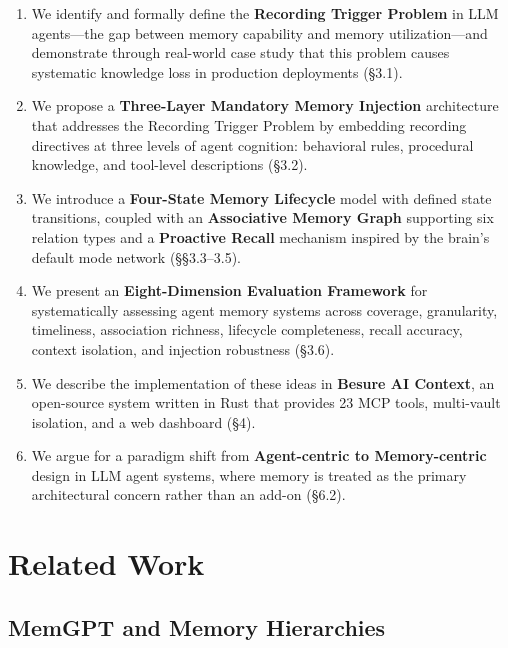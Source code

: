 \documentclass[11pt]{article}
\begin{document}
\begin{enumerate}
    \item We identify and formally define the \textbf{Recording Trigger Problem} in LLM agents---the gap between memory capability and memory utilization---and demonstrate through real-world case study that this problem causes systematic knowledge loss in production deployments (\S3.1).

    \item We propose a \textbf{Three-Layer Mandatory Memory Injection} architecture that addresses the Recording Trigger Problem by embedding recording directives at three levels of agent cognition: behavioral rules, procedural knowledge, and tool-level descriptions (\S3.2).

    \item We introduce a \textbf{Four-State Memory Lifecycle} model with defined state transitions, coupled with an \textbf{Associative Memory Graph} supporting six relation types and a \textbf{Proactive Recall} mechanism inspired by the brain's default mode network (\S\S3.3--3.5).

    \item We present an \textbf{Eight-Dimension Evaluation Framework} for systematically assessing agent memory systems across coverage, granularity, timeliness, association richness, lifecycle completeness, recall accuracy, context isolation, and injection robustness (\S3.6).

    \item We describe the implementation of these ideas in \textbf{Besure AI Context}, an open-source system written in Rust that provides 23 MCP tools, multi-vault isolation, and a web dashboard (\S4).

    \item We argue for a paradigm shift from \textbf{Agent-centric to Memory-centric} design in LLM agent systems, where memory is treated as the primary architectural concern rather than an add-on (\S6.2).
\end{enumerate}


\section{Related Work}

\subsection{MemGPT and Memory Hierarchies}
\end{document}
